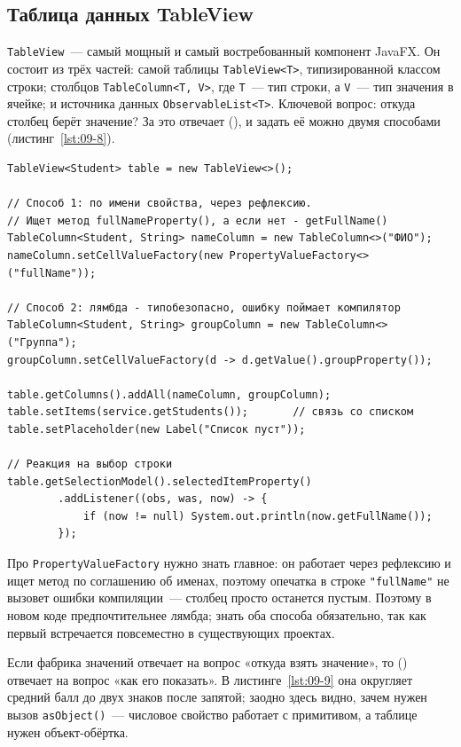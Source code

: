 \subsection{Таблица данных TableView}

\texttt{TableView}~--- самый мощный и самый востребованный компонент JavaFX. Он
состоит из трёх частей: самой таблицы \texttt{TableView<T>}, типизированной
классом строки; столбцов \texttt{TableColumn<T, V>}, где \texttt{T}~--- тип
строки, а \texttt{V}~--- тип значения в ячейке; и источника данных
\texttt{ObservableList<T>}. Ключевой вопрос: откуда столбец берёт значение? За
это отвечает  (), и задать её можно
двумя способами (листинг~\ref{lst:09-8}).

\begin{listing}[H]
\begin{verbatim}
TableView<Student> table = new TableView<>();

// Способ 1: по имени свойства, через рефлексию.
// Ищет метод fullNameProperty(), а если нет - getFullName()
TableColumn<Student, String> nameColumn = new TableColumn<>("ФИО");
nameColumn.setCellValueFactory(new PropertyValueFactory<>("fullName"));

// Способ 2: лямбда - типобезопасно, ошибку поймает компилятор
TableColumn<Student, String> groupColumn = new TableColumn<>("Группа");
groupColumn.setCellValueFactory(d -> d.getValue().groupProperty());

table.getColumns().addAll(nameColumn, groupColumn);
table.setItems(service.getStudents());       // связь со списком
table.setPlaceholder(new Label("Список пуст"));

// Реакция на выбор строки
table.getSelectionModel().selectedItemProperty()
        .addListener((obs, was, now) -> {
            if (now != null) System.out.println(now.getFullName());
        });
\end{verbatim}
\caption{Таблица, столбцы и источник данных}
\label{lst:09-8}
\end{listing}

Про \texttt{PropertyValueFactory} нужно знать главное: он работает через
рефлексию и ищет метод по соглашению об именах, поэтому опечатка в строке
\texttt{"fullName"} не вызовет ошибки компиляции~--- столбец просто останется
пустым. Поэтому в новом коде предпочтительнее лямбда; знать оба способа
обязательно, так как первый встречается повсеместно в существующих проектах.

Если фабрика значений отвечает на вопрос «откуда взять значение», то
 () отвечает на вопрос «как его показать».
В листинге~\ref{lst:09-9} она округляет средний балл до двух знаков после
запятой; заодно здесь видно, зачем нужен вызов \texttt{asObject()}~--- числовое
свойство работает с примитивом, а таблице нужен объект-обёртка.


